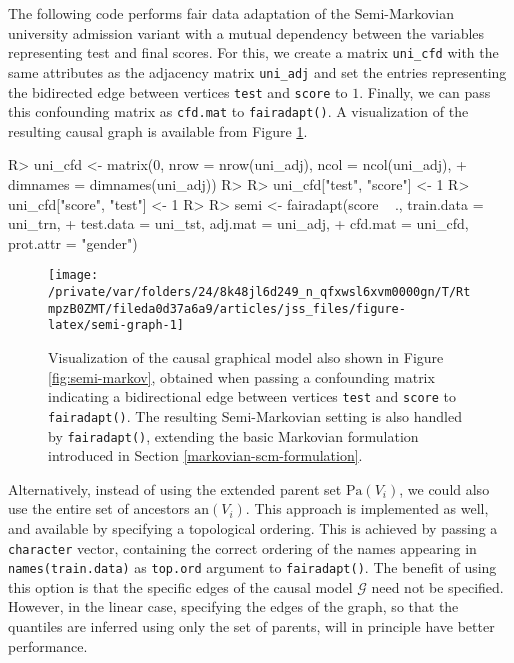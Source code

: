 \documentclass[
  nojss]{jss}
\begin{document}
The following code performs fair data adaptation of the Semi-Markovian
university admission variant with a mutual dependency between the
variables representing test and final scores. For this, we create a
matrix \texttt{uni\_cfd} with the same attributes as the adjacency
matrix \texttt{uni\_adj} and set the entries representing the bidirected
edge between vertices \texttt{test} and \texttt{score} to \(1\).
Finally, we can pass this confounding matrix as \texttt{cfd.mat} to
\texttt{fairadapt()}. A visualization of the resulting causal graph is
available from Figure \ref{fig:semi-graph}.

\begin{CodeChunk}
\begin{CodeInput}
R> uni_cfd <- matrix(0, nrow = nrow(uni_adj), ncol = ncol(uni_adj),
+                   dimnames = dimnames(uni_adj))
R> 
R> uni_cfd["test", "score"] <- 1
R> uni_cfd["score", "test"] <- 1
R> 
R> semi <- fairadapt(score ~ ., train.data = uni_trn,
+                   test.data = uni_tst, adj.mat = uni_adj,
+                   cfd.mat = uni_cfd, prot.attr = "gender")
\end{CodeInput}
\end{CodeChunk}

\begin{CodeChunk}
\begin{figure}

{\centering \texttt{[image: /private/var/folders/24/8k48jl6d249\_n\_qfxwsl6xvm0000gn/T/RtmpzB0ZMT/fileda0d37a6a9/articles/jss\_files/figure-latex/semi-graph-1]} 

}

\caption{Visualization of the causal graphical model also shown in Figure \ref{fig:semi-markov}, obtained when passing a confounding matrix indicating a bidirectional edge between vertices \texttt{test} and \texttt{score} to \texttt{fairadapt()}. The resulting Semi-Markovian setting is also handled by \texttt{fairadapt()}, extending the basic Markovian formulation introduced in Section \ref{markovian-scm-formulation}.}\label{fig:semi-graph}
\end{figure}
\end{CodeChunk}

Alternatively, instead of using the extended parent set
\(\mathrm{Pa}(V_i)\), we could also use the entire set of ancestors
\(\mathrm{an}(V_i)\). This approach is implemented as well, and
available by specifying a topological ordering. This is achieved by
passing a \texttt{character} vector, containing the correct ordering of
the names appearing in \texttt{names(train.data)} as \texttt{top.ord}
argument to \texttt{fairadapt()}. The benefit of using this option is
that the specific edges of the causal model \(\mathcal{G}\) need not be
specified. However, in the linear case, specifying the edges of the
graph, so that the quantiles are inferred using only the set of parents,
will in principle have better performance.
\end{document}

